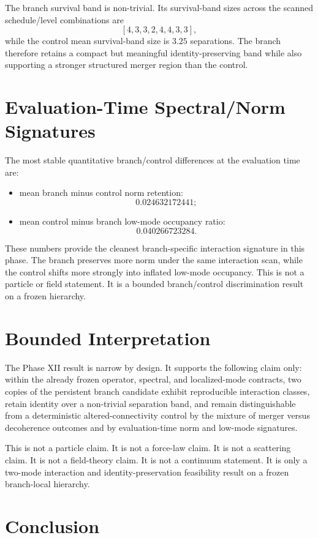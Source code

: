 \documentclass[11pt]{article}
\begin{document}
The branch survival band is non-trivial. Its survival-band sizes across the scanned schedule/level combinations are
\[
[4,3,3,2,4,4,3,3],
\]
while the control mean survival-band size is $3.25$ separations. The branch therefore retains a compact but meaningful identity-preserving band while also supporting a stronger structured merger region than the control.

\section{Evaluation-Time Spectral/Norm Signatures}

The most stable quantitative branch/control differences at the evaluation time are:
\begin{itemize}
\item mean branch minus control norm retention:
\[
0.024632172441;
\]
\item mean control minus branch low-mode occupancy ratio:
\[
0.040266723284.
\]
\end{itemize}

These numbers provide the cleanest branch-specific interaction signature in this phase. The branch preserves more norm under the same interaction scan, while the control shifts more strongly into inflated low-mode occupancy. This is not a particle or field statement. It is a bounded branch/control discrimination result on a frozen hierarchy.

\section{Bounded Interpretation}

The Phase XII result is narrow by design. It supports the following claim only: within the already frozen operator, spectral, and localized-mode contracts, two copies of the persistent branch candidate exhibit reproducible interaction classes, retain identity over a non-trivial separation band, and remain distinguishable from a deterministic altered-connectivity control by the mixture of merger versus decoherence outcomes and by evaluation-time norm and low-mode signatures.

This is not a particle claim. It is not a force-law claim. It is not a scattering claim. It is not a field-theory claim. It is not a continuum statement. It is only a two-mode interaction and identity-preservation feasibility result on a frozen branch-local hierarchy.

\section{Conclusion}
\end{document}
